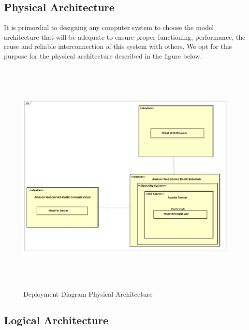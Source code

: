 	\subsection{Physical Architecture}
	It is primordial to designing any computer system to choose the model architecture that will be adequate to ensure proper functioning, performance, the reuse and reliable interconnection of this system with others. We opt for this purpose for the physical architecture described in the figure below.
	\begin{figure}[h]
		\centering
		\includegraphics[width=16.5cm,height=12cm]{DeploymentDiagramPhysicalArchitecture.png}
		\caption{Deployment Diagram Physical Architecture}
	\end{figure}  

	\clearpage
    \newpage  
	
	\subsection{Logical Architecture}
	\begin{figure}[!htb]

	\end{figure}  

    \pagebreak
    \clearpage
	\newpage
